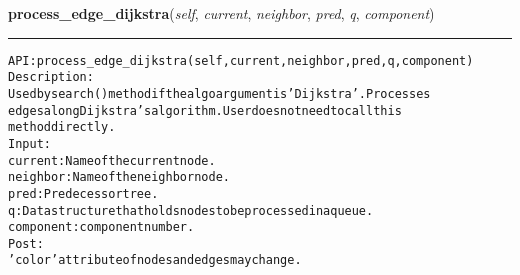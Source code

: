     \label{coinor:gimpy:graph:Graph:process_edge_dijkstra}

    \vspace{0.5ex}

\hspace{.8\funcindent}\begin{boxedminipage}{\funcwidth}

    \raggedright \textbf{process\_edge\_dijkstra}(\textit{self}, \textit{current}, \textit{neighbor}, \textit{pred}, \textit{q}, \textit{component})

    \vspace{-1.5ex}

    \rule{\textwidth}{0.5\fboxrule}
\setlength{\parskip}{2ex}
\begin{alltt}

API: process\_edge\_dijkstra(self, current, neighbor, pred, q, component)
Description:
Used by search() method if the algo argument is 'Dijkstra'. Processes
edges along Dijkstra's algorithm. User does not need to call this
method directly.
Input:
    current: Name of the current node.
    neighbor: Name of the neighbor node.
    pred: Predecessor tree.
    q: Data structure that holds nodes to be processed in a queue.
    component: component number.
Post:
    'color' attribute of nodes and edges may change.
\end{alltt}

\setlength{\parskip}{1ex}
    \end{boxedminipage}

    \label{coinor:gimpy:graph:Graph:process_edge_flow}

    \vspace{0.5ex}

